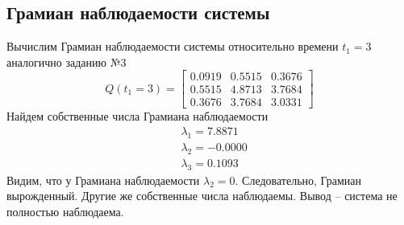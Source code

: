 \documentclass[a4paper, 12pt]{article}
\begin{document}
    \subsection{Грамиан наблюдаемости системы}
    Вычислим Грамиан наблюдаемости системы относительно времени $t_1=3$ аналогично заданию №3
    $$
    Q(t_1=3)=\begin{bmatrix}
    0.0919    &0.5515    &0.3676\\
    0.5515    &4.8713    &3.7684\\
    0.3676    &3.7684    &3.0331
    \end{bmatrix}
    $$
    Найдем собственные числа Грамиана наблюдаемости
    \begin{align*}
    &\lambda_1=7.8871\\
    &\lambda_2=-0.0000\\
    &\lambda_3=0.1093
    \end{align*}
    Видим, что у Грамиана наблюдаемости $\lambda_2=0$. Следовательно, Грамиан вырожденный.
    Другие же собственные числа наблюдаемы. Вывод -- система не полностью наблюдаема.
    
\end{document}
